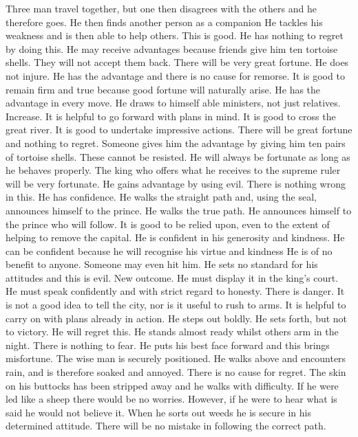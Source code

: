 	{Three man travel together, but one then disagrees with the others and he therefore goes. He then finds
		another person as a companion}
	{He tackles his weakness and is then able to help others. This is good. He has nothing to regret by doing this.}
	{He may receive advantages because friends give him ten tortoise shells. They will not accept them back.
		There will be very great fortune.}
	{He does not injure. He has the advantage and there is no cause for remorse. It is good to remain firm and
		true because good fortune will naturally arise. He has the advantage in every move. He draws to
		himself able ministers, not just relatives.}
\or {}
	{Increase. It is helpful to go forward with plans in mind. It is good to cross the great river.}
	{It is good to undertake impressive actions. There will be great fortune and nothing to regret.}
	{Someone gives him the advantage by giving him ten pairs of tortoise shells. These cannot be resisted.
		He will always be fortunate as long as he behaves properly. The king who offers what he receives
		to the supreme ruler will be very fortunate.}
	{He gains advantage by using evil. There is nothing wrong in this. He has confidence. He walks the
		straight path and, using the seal, announces himself to the prince.}
	{He walks the true path. He announces himself to the prince who will follow. It is good to be relied upon,
		even to the extent of helping to remove the capital.}
	{He is confident in his generosity and kindness. He can be confident because he will recognise his virtue
		and kindness}
	{He is of no benefit to anyone. Someone may even hit him. He sets no standard for his attitudes and this
		is evil.}
\or {}
	{New outcome. He must display it in the king's court. He must speak confidently and with strict regard
		to honesty. There is danger. It is not a good idea to tell the city, nor is it useful to rush to
		arms. It is helpful to carry on with plans already in action.}
	{He steps out boldly. He sets forth, but not to victory. He will regret this.}
	{He stands almost ready whilst others arm in the night. There is nothing to fear.}
	{He puts his best face forward and this brings misfortune. The wise man is securely positioned. He walks
		above and encounters rain, and is therefore soaked and annoyed. There is no cause for regret.}
	{The skin on his buttocks has been stripped away and he walks with difficulty. If he were led like a sheep
		there would be no worries. However, if he were to hear what is said he would not believe it.}
	{When he sorts out weeds he is secure in his determined attitude. There will be no mistake in following
		the correct path.}
